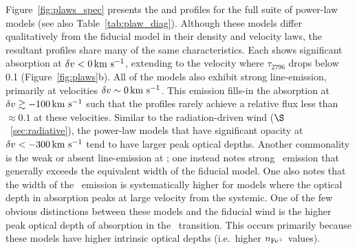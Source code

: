 \documentclass[]{emulateapj}
\begin{document}
Figure~\ref{fig:plaws_spec} presents the  and 
profiles for the full suite of power-law models (see also
Table~\ref{tab:plaw_diag}).  Although these
models differ qualitatively from the fiducial model in their density
and velocity laws, the resultant profiles share many of the same
characteristics.  Each shows significant absorption at $\delta v < 0
\, {\rm km~s^{-1}}$, extending to the velocity where $\tau_{2796}$ drops below 0.1
(Figure~\ref{fig:plaws}b).  All of the models also exhibit strong
line-emission, primarily at velocities $\delta v \sim 0 \, {\rm km~s^{-1}}$.  
This emission fills-in the  absorption at $\delta v \gtrsim
-100 \, {\rm km~s^{-1}}$ such that the profiles rarely achieve a relative flux less
than $\approx 0.1$ at these velocities. 
Similar to the radiation-driven wind ($\S$~\ref{sec:radiative}),
the power-law models that have significant opacity at $\delta v <
-300 \, {\rm km~s^{-1}}$ tend to have larger peak optical depths.  Another commonality is
the weak or absent line-emission at \feiia; one instead notes strong
\feiic\ emission that generally exceeds the equivalent width of the
fiducial model.  One also notes that the width of the \feiis\ emission
is systematically higher for models where the optical depth in
absorption peaks at large velocity from the systemic.
One of the few obvious distinctions between these models and the fiducial wind is
the higher peak optical depth of absorption in the \feiib\
transition.  This occurs primarily because these models have 
higher intrinsic optical depths (i.e.\ higher $n_{\rm Fe^+}$ values).
\end{document}

